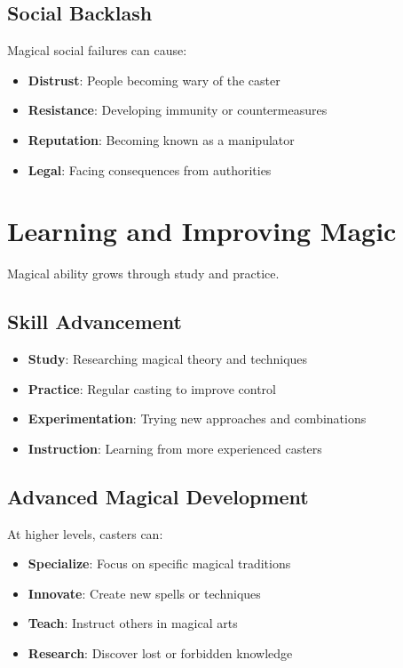 \subsection*{Social Backlash}
Magical social failures can cause:
\begin{itemize}
\item \textbf{Distrust}: People becoming wary of the caster
\item \textbf{Resistance}: Developing immunity or countermeasures
\item \textbf{Reputation}: Becoming known as a manipulator
\item \textbf{Legal}: Facing consequences from authorities
\end{itemize}

\section{Learning and Improving Magic} 

Magical ability grows through study and practice.

\subsection*{Skill Advancement}
\begin{itemize}
\item \textbf{Study}: Researching magical theory and techniques
\item \textbf{Practice}: Regular casting to improve control
\item \textbf{Experimentation}: Trying new approaches and combinations
\item \textbf{Instruction}: Learning from more experienced casters
\end{itemize}

\subsection*{Advanced Magical Development}
At higher levels, casters can:
\begin{itemize}
\item \textbf{Specialize}: Focus on specific magical traditions
\item \textbf{Innovate}: Create new spells or techniques
\item \textbf{Teach}: Instruct others in magical arts
\item \textbf{Research}: Discover lost or forbidden knowledge
\end{itemize}


